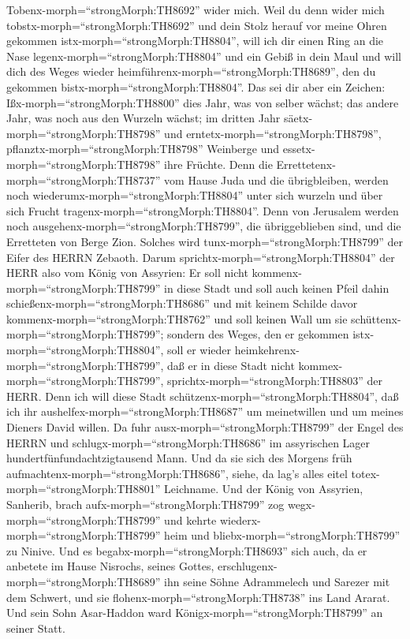 Tobenx-morph=``strongMorph:TH8692'' wider mich.  Weil du
denn wider mich tobstx-morph=``strongMorph:TH8692'' und dein Stolz
herauf vor meine Ohren gekommen istx-morph=``strongMorph:TH8804'', will
ich dir einen Ring an die Nase legenx-morph=``strongMorph:TH8804'' und
ein Gebiß in dein Maul und will dich des Weges wieder
heimführenx-morph=``strongMorph:TH8689'', den du gekommen
bistx-morph=``strongMorph:TH8804''.  Das sei dir aber ein
Zeichen: Ißx-morph=``strongMorph:TH8800'' dies Jahr, was von selber
wächst; das andere Jahr, was noch aus den Wurzeln wächst; im dritten
Jahr säetx-morph=``strongMorph:TH8798'' und
erntetx-morph=``strongMorph:TH8798'',
pflanztx-morph=``strongMorph:TH8798'' Weinberge und
essetx-morph=``strongMorph:TH8798'' ihre Früchte.  Denn die
Errettetenx-morph=``strongMorph:TH8737'' vom Hause Juda und die
übrigbleiben, werden noch wiederumx-morph=``strongMorph:TH8804'' unter
sich wurzeln und über sich Frucht tragenx-morph=``strongMorph:TH8804''.
 Denn von Jerusalem werden noch
ausgehenx-morph=``strongMorph:TH8799'', die übriggeblieben sind, und die
Erretteten von Berge Zion. Solches wird
tunx-morph=``strongMorph:TH8799'' der Eifer des HERRN Zebaoth.
 Darum sprichtx-morph=``strongMorph:TH8804'' der HERR also
vom König von Assyrien: Er soll nicht
kommenx-morph=``strongMorph:TH8799'' in diese Stadt und soll auch keinen
Pfeil dahin schießenx-morph=``strongMorph:TH8686'' und mit keinem
Schilde davor kommenx-morph=``strongMorph:TH8762'' und soll keinen Wall
um sie schüttenx-morph=``strongMorph:TH8799'';  sondern des
Weges, den er gekommen istx-morph=``strongMorph:TH8804'', soll er wieder
heimkehrenx-morph=``strongMorph:TH8799'', daß er in diese Stadt nicht
kommex-morph=``strongMorph:TH8799'',
sprichtx-morph=``strongMorph:TH8803'' der HERR.  Denn ich
will diese Stadt schützenx-morph=``strongMorph:TH8804'', daß ich ihr
aushelfex-morph=``strongMorph:TH8687'' um meinetwillen und um meines
Dieners David willen.  Da fuhr
ausx-morph=``strongMorph:TH8799'' der Engel des HERRN und
schlugx-morph=``strongMorph:TH8686'' im assyrischen Lager
hundertfünfundachtzigtausend Mann. Und da sie sich des Morgens früh
aufmachtenx-morph=``strongMorph:TH8686'', siehe, da lag's alles eitel
totex-morph=``strongMorph:TH8801'' Leichname.  Und der
König von Assyrien, Sanherib, brach aufx-morph=``strongMorph:TH8799''
zog wegx-morph=``strongMorph:TH8799'' und kehrte
wiederx-morph=``strongMorph:TH8799'' heim und
bliebx-morph=``strongMorph:TH8799'' zu Ninive.  Und es
begabx-morph=``strongMorph:TH8693'' sich auch, da er anbetete im Hause
Nisrochs, seines Gottes, erschlugenx-morph=``strongMorph:TH8689'' ihn
seine Söhne Adrammelech und Sarezer mit dem Schwert, und sie
flohenx-morph=``strongMorph:TH8738'' ins Land Ararat. Und sein Sohn
Asar-Haddon ward Königx-morph=``strongMorph:TH8799'' an seiner Statt.

